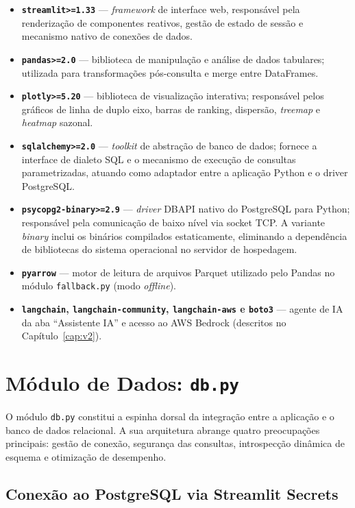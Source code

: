 \documentclass[12pt,a4paper]{report}
\begin{document}
\begin{itemize}
    \item \textbf{\texttt{streamlit>=1.33}} — \textit{framework} de interface web,
    responsável pela renderização de componentes reativos, gestão de estado de sessão e
    mecanismo nativo de conexões de dados.
    \item \textbf{\texttt{pandas>=2.0}} — biblioteca de manipulação e análise de dados
    tabulares; utilizada para transformações pós-consulta e merge entre DataFrames.
    \item \textbf{\texttt{plotly>=5.20}} — biblioteca de visualização interativa;
    responsável pelos gráficos de linha de duplo eixo, barras de ranking,
    dispersão, \textit{treemap} e \textit{heatmap} sazonal.
    \item \textbf{\texttt{sqlalchemy>=2.0}} — \textit{toolkit} de abstração de banco de
    dados; fornece a interface de dialeto SQL e o mecanismo de execução de consultas
    parametrizadas, atuando como adaptador entre a aplicação Python e o driver
    PostgreSQL.
    \item \textbf{\texttt{psycopg2-binary>=2.9}} — \textit{driver} DBAPI nativo do
    PostgreSQL para Python; responsável pela comunicação de baixo nível via socket TCP.
    A variante \textit{binary} inclui os binários compilados estaticamente,
    eliminando a dependência de bibliotecas do sistema operacional no servidor de
    hospedagem.
    \item \textbf{\texttt{pyarrow}} — motor de leitura de arquivos Parquet utilizado
    pelo Pandas no módulo \texttt{fallback.py} (modo \textit{offline}).
    \item \textbf{\texttt{langchain}, \texttt{langchain-community}, \texttt{langchain-aws}
    e \texttt{boto3}} — agente de IA da aba ``Assistente IA'' e acesso ao AWS Bedrock
    (descritos no Capítulo~\ref{cap:v2}).
\end{itemize}

\section{Módulo de Dados: \texttt{db.py}}

O módulo \texttt{db.py} constitui a espinha dorsal da integração entre a aplicação e o
banco de dados relacional. A sua arquitetura abrange quatro preocupações principais:
gestão de conexão, segurança das consultas, introspecção dinâmica de esquema e
otimização de desempenho.

\subsection{Conexão ao PostgreSQL via Streamlit Secrets}
\end{document}
